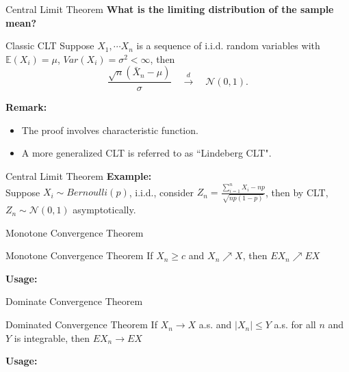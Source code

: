 \documentclass [aspectratio=169]{beamer}
\newcommand{\mc}{\mathcal}
\begin{document}
\begin{frame}{Central Limit Theorem}
\textbf{What is the limiting distribution of the sample mean?}\\
\begin{block}{Classic CLT}
Suppose $X_1, \cdots X_n$ is a sequence of i.i.d. random variables with $\mathbb{E}(X_i) = \mu$, $Var(X_i) = \sigma^2 < \infty$, then
$$
\frac{\sqrt{n}(\bar{X}_n - \mu)}{\sigma} \quad \xrightarrow[]{d} \quad \mc{N}(0,1).
$$
\end{block}
\vspace{0.1in}
\textbf{Remark:}\\
\begin{itemize}
    \item The proof involves characteristic function.
    \item A more generalized CLT is referred to as ``Lindeberg CLT". 
\end{itemize}
\end{frame}


\begin{frame}{Central Limit Theorem}
\textbf{Example:}\\
Suppose $X_i \sim Bernoulli(p)$, i.i.d.,  consider $Z_n = \frac{\sum_{i=1}^n {X_i} - np}{\sqrt{np(1-p)}}$, then by CLT, $Z_n \sim \mc{N}(0,1)$ asymptotically. 
\vspace{1in}

\end{frame}

\begin{frame}{Monotone Convergence Theorem}
    \begin{block}{Monotone Convergence Theorem}
    If $X_n \geq c$ and $X_n \nearrow X$, then $EX_n \nearrow EX$ 
    \end{block}
    \textbf{Usage: }
    \vspace{1.8in}
\end{frame}

\begin{frame}{Dominate Convergence Theorem}
    \begin{block}{Dominated Convergence Theorem}
    If $X_n \to X$ a.s. and $|X_n| \leq Y$ a.s. for all $n$ and $Y$ is integrable, then $EX_n \to EX$ 
    \end{block}
    \textbf{Usage: }
    \vspace{1.8in}
\end{frame}
\end{document}
